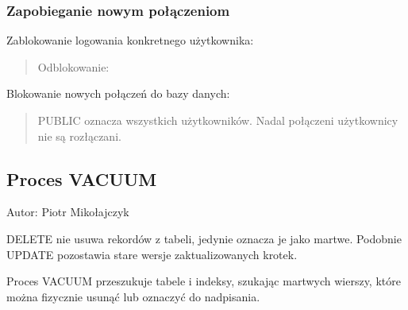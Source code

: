 \documentclass[letterpaper,10pt,polish]{sphinxmanual}
\begin{document}
\subsubsection{Zapobieganie nowym połączeniom}
\label{\detokenize{rozdzial2/Kontrola_i_konserwacja/kontrola_i_konserwacja:zapobieganie-nowym-polaczeniom}}
\sphinxAtStartPar
Zablokowanie logowania konkretnego użytkownika:
\begin{quote}

\begin{sphinxVerbatim}[commandchars=\\\{\}]
\end{sphinxVerbatim}

\sphinxAtStartPar
Odblokowanie:

\begin{sphinxVerbatim}[commandchars=\\\{\}]
\end{sphinxVerbatim}
\end{quote}

\sphinxAtStartPar
Blokowanie nowych połączeń do bazy danych:
\begin{quote}

\begin{sphinxVerbatim}[commandchars=\\\{\}]
\end{sphinxVerbatim}

\sphinxAtStartPar
PUBLIC oznacza wszystkich użytkowników. Nadal połączeni użytkownicy nie są rozłączani.
\end{quote}


\subsection{Proces VACUUM}
\label{\detokenize{rozdzial2/Kontrola_i_konserwacja/kontrola_i_konserwacja:proces-vacuum}}
\sphinxAtStartPar
Autor: Piotr Mikołajczyk

\sphinxAtStartPar
DELETE nie usuwa rekordów z tabeli, jedynie oznacza je jako martwe. Podobnie UPDATE pozostawia stare wersje zaktualizowanych krotek.

\sphinxAtStartPar
Proces VACUUM przeszukuje tabele i indeksy, szukając martwych wierszy, które można fizycznie usunąć lub oznaczyć do nadpisania.
\end{document}
